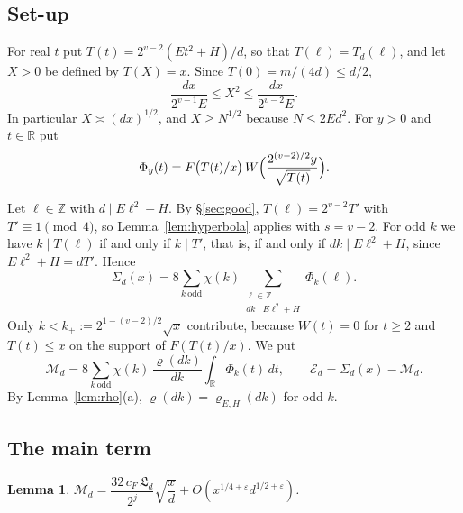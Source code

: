\documentclass[11pt]{amsart}
\newtheorem{lemma}[theorem]{Lemma}
\theoremstyle{remark}
\theoremstyle{definition}
\numberwithin{equation}{section}
\newcommand{\Z}{\mathbb{Z}}
\newcommand{\R}{\mathbb{R}}
\newcommand{\eps}{\varepsilon}
\newcommand{\Lf}{\mathfrak{L}}
\begin{document}
\subsection{Set-up}
For real $t$ put $T(t)=2^{v-2}(Et^2+H)/d$, so that $T(\ell)=T_d(\ell)$, and let $X>0$ be defined by $T(X)=x$. Since $T(0)=m/(4d)\le d/2$,
\begin{equation}\label{eq:Xsize}
\frac{dx}{2^{v-1}E}\le X^2\le\frac{dx}{2^{v-2}E}.
\end{equation}
In particular $X\asymp(dx)^{1/2}$, and $X\ge N^{1/2}$ because $N\le2Ed^2$. For $y>0$ and $t\in\R$ put
\[
\Phi_y(t)=F\bigl(T(t)/x\bigr)\,W\Bigl(\frac{2^{(v-2)/2}y}{\sqrt{T(t)}}\Bigr).
\]

Let $\ell\in\Z$ with $d\mid E\ell^2+H$. By \S\ref{sec:good}, $T(\ell)=2^{v-2}T'$ with $T'\equiv1\pmod 4$, so Lemma~\ref{lem:hyperbola} applies with $s=v-2$. For odd $k$ we have $k\mid T(\ell)$ if and only if $k\mid T'$, that is, if and only if $dk\mid E\ell^2+H$, since $E\ell^2+H=dT'$. Hence
\begin{equation}\label{eq:Sigma2}
\Sigma_d(x)=8\sum_{k\ \mathrm{odd}}\chi(k)\sum_{\substack{\ell\in\Z\\ dk\mid E\ell^2+H}}\Phi_k(\ell).
\end{equation}
Only $k<k_+:=2^{1-(v-2)/2}\sqrt x$ contribute, because $W(t)=0$ for $t\ge2$ and $T(t)\le x$ on the support of $F(T(t)/x)$. We put
\begin{equation}\label{eq:ME}
\mathcal M_d=8\sum_{k\ \mathrm{odd}}\chi(k)\,\frac{\varrho(dk)}{dk}\int_\R\Phi_k(t)\,dt,\qquad\mathcal E_d=\Sigma_d(x)-\mathcal M_d .
\end{equation}
By Lemma~\ref{lem:rho}(a), $\varrho(dk)=\varrho_{E,H}(dk)$ for odd $k$.

\subsection{The main term}

\begin{lemma}\label{lem:main}
$\mathcal M_d=\dfrac{32\,c_F\,\Lf_d}{2^j}\sqrt{\dfrac xd}+O(x^{1/4+\eps}d^{1/2+\eps})$.
\end{lemma}
\end{document}
